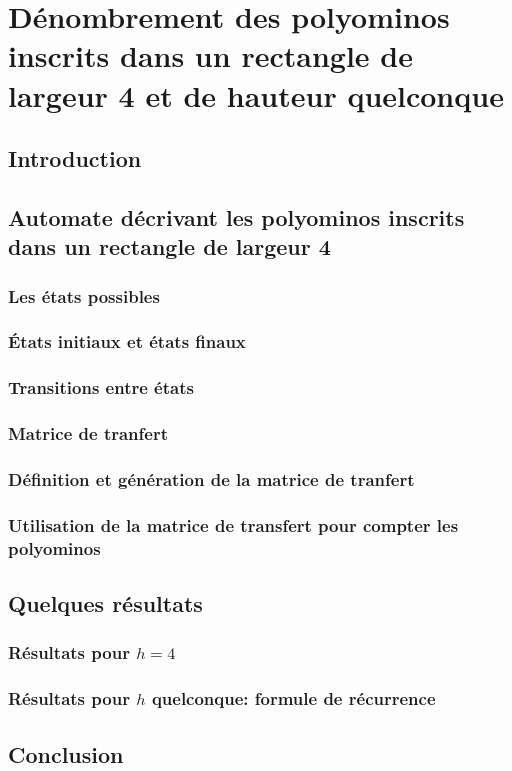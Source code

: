 \chapter{Dénombrement des polyominos inscrits dans un rectangle de largeur 4 et de hauteur quelconque}
\section*{Introduction}
\section{Automate décrivant les polyominos inscrits dans un rectangle de largeur 4}
\subsection{Les états possibles}
\subsection{États initiaux et états finaux}
\subsection{Transitions entre états}
\subsection{Matrice de tranfert}
\subsection{Définition et génération de la matrice de tranfert}
\subsection{Utilisation de la matrice de transfert pour compter les polyominos}
\section{Quelques résultats}
\subsection{Résultats pour $h=4$}
\subsection{Résultats pour $h$ quelconque: formule de récurrence }
\section*{Conclusion}